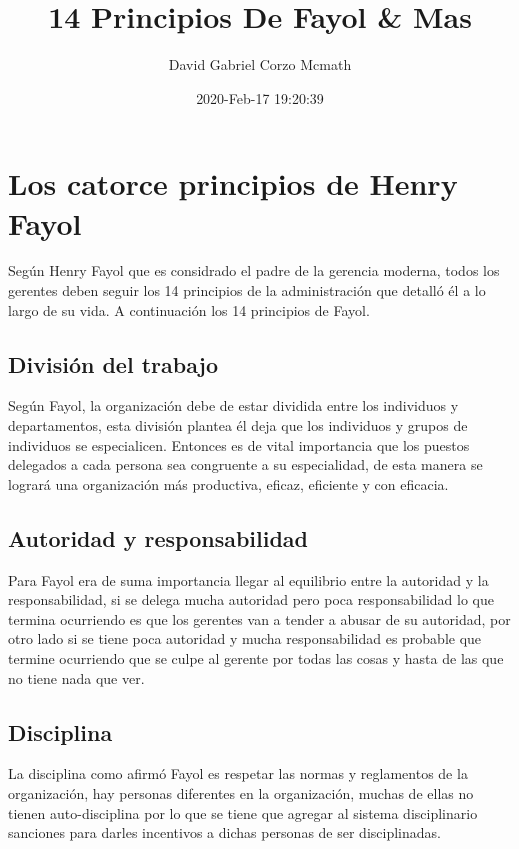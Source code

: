 \documentclass{article}
\title{14 Principios De Fayol \& Mas}
\author{David Gabriel Corzo Mcmath}
\date{2020-Feb-17 19:20:39}
\begin{document}
\maketitle

\section{Los catorce principios de Henry Fayol}
Según Henry Fayol que es considrado el padre de la gerencia moderna, todos los gerentes deben seguir los 14 principios de la administración que detalló él a lo largo de su vida. A continuación los 14 principios de Fayol.


\subsection{División del trabajo}
Según Fayol, la organización debe de estar dividida entre los individuos y departamentos, esta división plantea él deja que los individuos y grupos de individuos se especialicen. Entonces es de vital importancia que los puestos delegados a cada persona sea congruente a su especialidad, de esta manera se logrará una organización más productiva, eficaz, eficiente y con eficacia.


\subsection{Autoridad y responsabilidad}
Para Fayol era de suma importancia llegar al equilibrio entre la autoridad y la responsabilidad, si se delega mucha autoridad pero poca responsabilidad lo que termina ocurriendo es que los gerentes van a tender a abusar de su autoridad, por otro lado si se tiene poca autoridad y mucha responsabilidad es probable que termine ocurriendo que se culpe al gerente por todas las cosas y hasta de las que no tiene nada que ver. 


\subsection{Disciplina}
La disciplina como afirmó Fayol es respetar las normas y reglamentos de la organización, hay personas diferentes en la organización, muchas de ellas no tienen auto-disciplina por lo que se tiene que agregar al sistema disciplinario sanciones para darles incentivos a dichas personas de ser disciplinadas.
\end{document}
